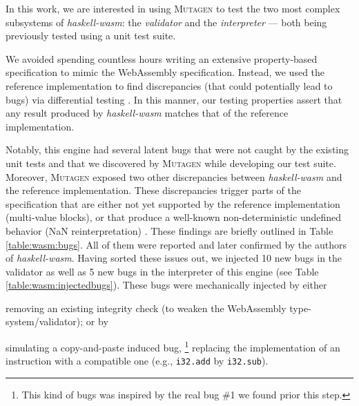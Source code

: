 \documentclass[sigconf,review,anonymous]{acmart}
\newcommand{\mutagen}{\textsc{Mutagen}\xspace}
\begin{document}
In this work, we are interested in using \mutagen to test the two most complex
subsystems of \textit{haskell-wasm}: the \emph{validator} and the
\emph{interpreter} --- both being previously tested using a unit test suite.


We avoided spending countless hours writing an extensive property-based
specification to mimic the WebAssembly specification.
%
Instead, we used the reference implementation to find discrepancies (that could
potentially lead to bugs) via differential testing
\cite{mckeeman1998differential}.
%
In this manner, our testing properties assert that any result produced by
\textit{haskell-wasm} matches that of the reference implementation.

Notably, this engine had several latent bugs that were not caught by the
existing unit tests and that we discovered by \mutagen while developing our test
suite.
%
Moreover, \mutagen exposed two other discrepancies between \textit{haskell-wasm}
and the reference implementation.
%
These discrepancies trigger parts of the specification that are either not yet
supported by the reference implementation (multi-value blocks), or that produce
a well-known non-deterministic undefined behavior (NaN reinterpretation)
\cite{perenyi2020stack}.
%
These findings are briefly outlined in Table \ref{table:wasm:bugs}.
%
All of them were reported and later confirmed by the authors of
\textit{haskell-wasm}.
%
Having sorted these issues out, we injected 10 new bugs in the validator as well
as 5 new bugs in the interpreter of this engine (see Table
\ref{table:wasm:injectedbugs}).
%
These bugs were mechanically injected by either
%
\begin{inparaenum}
\item removing an existing integrity check (to weaken the WebAssembly
  type-system/validator); or by
\item simulating a copy-and-paste induced bug,%
  \footnote{This kind of bugs was inspired by the real bug \#1 we found prior
    this step.}
  replacing the implementation of an instruction with a compatible one
  (e.g., \texttt{i32.add} by \texttt{i32.sub}).
\end{inparaenum}




\end{document}
